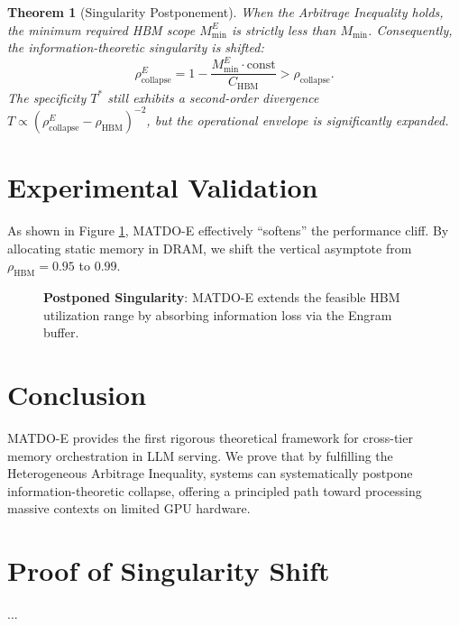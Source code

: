 \documentclass[11pt,a4paper]{article}
\theoremstyle{plain}
\newtheorem{theorem}{Theorem}[section]
\theoremstyle{definition}
\begin{document}
\begin{theorem}[Singularity Postponement]\label{thm:engram_soften}
When the Arbitrage Inequality holds, the minimum required HBM scope $M_{\min}^E$ is strictly less than $M_{\min}$. Consequently, the information-theoretic singularity is shifted:
\begin{equation}
    \rho_{\text{collapse}}^E = 1 - \frac{M_{\min}^E \cdot \text{const}}{C_{\text{HBM}}} > \rho_{\text{collapse}}.
\end{equation}
The specificity $T^*$ still exhibits a second-order divergence $T \propto (\rho_{\text{collapse}}^E - \rho_{\text{HBM}})^{-2}$, but the operational envelope is significantly expanded.
\end{theorem}

\section{Experimental Validation}



As shown in Figure \ref{fig:softening}, MATDO-E effectively ``softens'' the performance cliff. By allocating static memory in DRAM, we shift the vertical asymptote from $\rho_{\text{HBM}} = 0.95$ to $0.99$.

\begin{figure}[h]
\centering
{}
\caption{\textbf{Postponed Singularity}: MATDO-E extends the feasible HBM utilization range by absorbing information loss via the Engram buffer.}
\label{fig:softening}
\end{figure}

\section{Conclusion}

MATDO-E provides the first rigorous theoretical framework for cross-tier memory orchestration in LLM serving. We prove that by fulfilling the Heterogeneous Arbitrage Inequality, systems can systematically postpone information-theoretic collapse, offering a principled path toward processing massive contexts on limited GPU hardware.

\appendix
\section{Proof of Singularity Shift}
...
\end{document}
